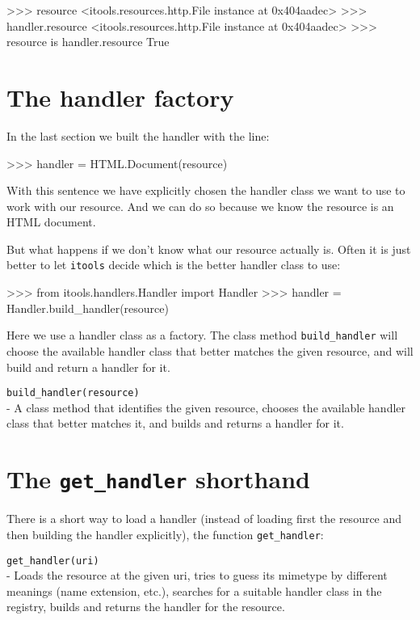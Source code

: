 \begin{code}
    >>> resource
    <itools.resources.http.File instance at 0x404aadec>
    >>> handler.resource
    <itools.resources.http.File instance at 0x404aadec>
    >>> resource is handler.resource
    True
\end{code}


\section{The handler factory}

In the last section we built the handler with the line:

\begin{code}
    >>> handler = HTML.Document(resource)
\end{code}

With this sentence we have explicitly chosen the handler class we want
to use to work with our resource. And we can do so because we know the
resource is an HTML document.

But what happens if we don't know what our resource actually is. Often
it is just better to let {\tt itools} decide which is the better handler
class to use:

\begin{code}
    >>> from itools.handlers.Handler import Handler
    >>> handler = Handler.build_handler(resource)
\end{code}

Here we use a handler class as a factory. The class method {\tt build\_handler}
will choose the available handler class that better matches the given resource,
and will build and return a handler for it.

\begin{api}
  {\tt build\_handler(resource)}\\
  - A class method that identifies the given resource, chooses the available
  handler class that better matches it, and builds and returns a handler for
  it.
\end{api}


\section{The {\tt get\_handler} shorthand}

There is a short way to load a handler (instead of loading first the resource
and then building the handler explicitly), the function {\tt get\_handler}:

\begin{api}
  {\tt get\_handler(uri)}\\
  - Loads the resource at the given uri, tries to guess its mimetype by
  different meanings (name extension, etc.), searches for a suitable
  handler class in the registry, builds and returns the handler for
  the resource.
\end{api}

